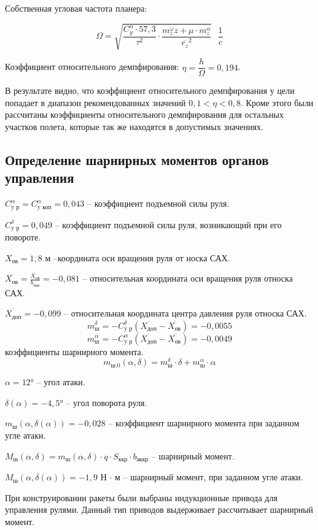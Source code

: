Собственная угловая частота планера:

$$\Omega= \sqrt{ \frac{C_y^\alpha \cdot 57,3}{\tau^2} \cdot \frac{m_z^\omega z+\mu\cdot m_z^\alpha}{\overline{r_z}^2} } \text{ } \dfrac{1}{c}$$

Коэффициент относительного демпфирования: $\eta=\dfrac{h}{\Omega}=0,194 $.

В результате видно, что коэффициент относительного демпфирования у цели попадает в диапазон рекомендованных значений $0,1 < \eta < 0,8$. Кроме этого были рассчитаны коэффициенты относительного демпфирования для остальных участков полета, которые так же находятся в допустимых значениях.

\subsection{Определение шарнирных моментов органов управления}
$C_\text{y р}^\alpha=C_\text{y коп}^\alpha = 0,043$ – коэффициент подъемной силы руля.

$C_\text{y р}^\delta=0,049 $ – коэффициент подъемной силы руля, возникающий при его повороте.

$X_\text{ов}=1,8$ м –координата оси вращения руля от носка САХ.

$\overline{X_\text{ов}}= \frac{X_\text{ов}} {b_\text{акр}}  =-0,081$ – относительная координата оси вращения руля относка САХ.

$\overline{X_\text{доп} }=-0,099$  – относительная координата центра давления руля относка САХ.
$$m_\text{ш}^\delta=-C_\text{y р}^\delta (\overline{X_\text{доп}}-\overline{X_\text{ов}})=-0,0055 $$
$$m_\text{ш}^\alpha=-C_\text{y р}^\alpha (\overline{X_\text{доп}}-\overline{X_\text{ов}})=-0,0049 $$
коэффициенты шарнирного момента.
$$m_\text{ш.0} (\alpha,\delta)=m_\text{ш}^\delta \cdot \delta+m_\text{ш}^\alpha \cdot \alpha$$

$\alpha=12°$ – угол атаки.

$\delta(\alpha)=-4,5°$ – угол поворота руля.

$m_\text{ш} (\alpha,\delta(\alpha))=-0,028 $ – коэффициент шарнирного момента при заданном угле атаки.

$M_\text{ш} (\alpha,\delta)=m_\text{ш} (\alpha,\delta) \cdot q \cdot S_\text{ккр} \cdot b_\text{аккр} $ – шарнирный момент.

$M_\text{ш} (\alpha,\delta(\alpha))=-1,9$ Н $\cdot$ м – шарнирный момент, при заданном угле атаки.

При конструировании ракеты были выбраны индукционные привода для управления рулями. Данный тип приводов выдерживает рассчитывает шарнирный момент.

